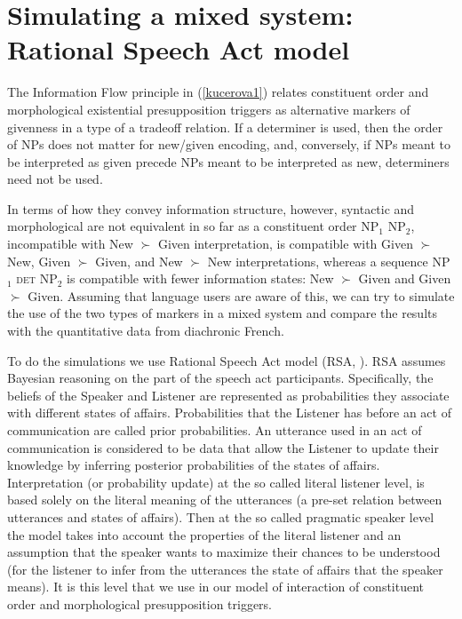 \documentclass[output=paper,modfonts,nonflat]{langsci/langscibook}
\begin{document}


\section{Simulating a mixed system: Rational Speech Act model}
\label{section:rsa}

The Information Flow principle in (\ref{kucerova1}) relates constituent order and morphological existential presupposition triggers as alternative markers of givenness in a type of a tradeoff relation. If a determiner is used, then the order of NPs does not matter for new/given encoding, and, conversely, if NPs meant to be interpreted as given precede NPs meant to be interpreted as new, determiners need not be used.

In terms of how they convey information structure, however, syntactic and morphological are not equivalent in so far as a constituent order NP$_{1}$ NP$_{2}$, incompatible with New $\succ$ Given interpretation, is compatible with Given $\succ$ New, Given $\succ$ Given, and New $\succ$ New interpretations, whereas a sequence NP$_{1}$ {\scshape det} NP$_{2}$ is compatible with fewer information states: New $\succ$ Given and Given $\succ$ Given. Assuming that language users are aware of this, we can try to simulate the use of the two types of markers in a mixed system and compare the results with the quantitative data from diachronic French.

To do the simulations we use Rational Speech Act model (RSA, \citet{FrankGoodman:2012}). RSA assumes Bayesian reasoning on the part of the speech act participants. Specifically, the beliefs of the Speaker and Listener are represented as probabilities they associate with different states of affairs. Probabilities that the Listener has before an act of communication are called prior probabilities. An utterance used in an act of communication is considered to be data that allow the Listener to update their knowledge by inferring posterior probabilities of the states of affairs. Interpretation (or probability update) at the so called literal listener level, is based solely on the literal meaning of the utterances (a pre-set relation between utterances and states of affairs). Then at the so called pragmatic speaker level the model takes into account the properties of the literal listener and an assumption that the speaker wants to maximize their chances to be understood (for the listener to infer from the utterances the state of affairs that the speaker means). It is this level that we use in our model of interaction of constituent order and morphological presupposition triggers.
\end{document}
